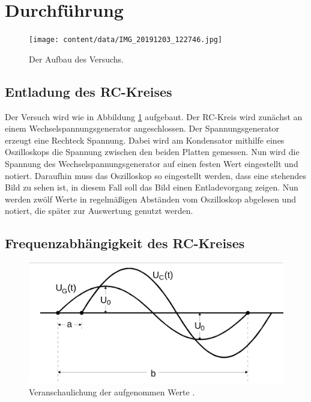 \section{Durchführung}
\label{sec:Durchführung}
\begin{figure}
    \centering
    \texttt{[image: content/data/IMG\_20191203\_122746.jpg]}
    \caption{Der Aufbau des Versuchs.}
    \label{fig:aufbau}
\end{figure}

\subsection{Entladung des RC-Kreises}
\label{sec:1}
Der Versuch wird wie in Abbildung \ref{fig:aufbau} aufgebaut.
Der RC-Kreis wird zunächst an einem Wechselspannungsgenerator angeschlossen.
Der Spannungsgenerator erzeugt eine Rechteck Spannung.
Dabei wird am Kondensator mithilfe eines Oszilloskops die Spannung zwischen den beiden Platten gemessen.
Nun wird die Spannung des Wechselspannungsgenerator auf einen festen Wert eingestellt und notiert.
Daraufhin muss das Oszilloskop so eingestellt werden, dass eine stehendes Bild zu sehen ist, in diesem Fall soll das Bild einen Entladevorgang zeigen.
Nun werden zwölf Werte in regelmäßigen Abständen vom Oszilloskop abgelesen und notiert, die später zur Auswertung genutzt werden.
\FloatBarrier
\subsection{Frequenzabhängigkeit des RC-Kreises}

\begin{figure}
    \centering
    \includegraphics[width=\textwidth]{content/data/a_und_b.jpg}
    \caption{Veranschaulichung der aufgenommen Werte \cite[S.282]{anleitung}.}
    \label{fig:a_und_b}
\end{figure}

